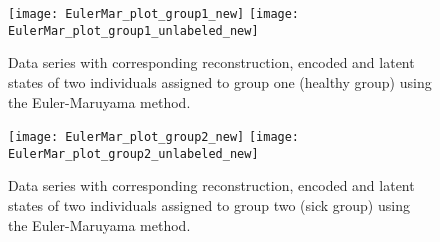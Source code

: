 \documentclass[11pt,titlepage]{article}
\theoremstyle{definition}
\theoremstyle{remark}
\begin{document}
	\begin{figure}[!h]
		\texttt{[image: EulerMar\_plot\_group1\_new]}
		\texttt{[image: EulerMar\_plot\_group1\_unlabeled\_new]}
		\caption{Data series with corresponding reconstruction, encoded and latent states of two individuals assigned to group one (healthy group) using the Euler-Maruyama method.} \label{Res:Method EulMar Group1}
	\end{figure}
	
	\begin{figure}[!h]
		\texttt{[image: EulerMar\_plot\_group2\_new]}
		\texttt{[image: EulerMar\_plot\_group2\_unlabeled\_new]}
		\caption{Data series with corresponding reconstruction, encoded and latent states of two individuals assigned to group two (sick group) using the Euler-Maruyama method.} \label{Res:Method EulMar Group2}
	\end{figure}
\end{document}
